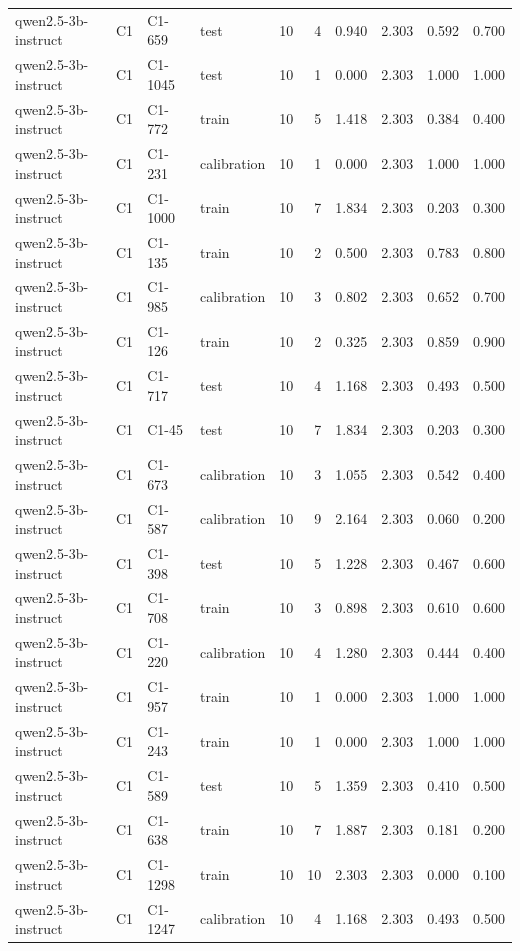 \begin{table}
\begin{tabular}{llllrrrrrr}
qwen2.5-3b-instruct & C1 & C1-659 & test & 10 & 4 & 0.940 & 2.303 & 0.592 & 0.700 \\
qwen2.5-3b-instruct & C1 & C1-1045 & test & 10 & 1 & 0.000 & 2.303 & 1.000 & 1.000 \\
qwen2.5-3b-instruct & C1 & C1-772 & train & 10 & 5 & 1.418 & 2.303 & 0.384 & 0.400 \\
qwen2.5-3b-instruct & C1 & C1-231 & calibration & 10 & 1 & 0.000 & 2.303 & 1.000 & 1.000 \\
qwen2.5-3b-instruct & C1 & C1-1000 & train & 10 & 7 & 1.834 & 2.303 & 0.203 & 0.300 \\
qwen2.5-3b-instruct & C1 & C1-135 & train & 10 & 2 & 0.500 & 2.303 & 0.783 & 0.800 \\
qwen2.5-3b-instruct & C1 & C1-985 & calibration & 10 & 3 & 0.802 & 2.303 & 0.652 & 0.700 \\
qwen2.5-3b-instruct & C1 & C1-126 & train & 10 & 2 & 0.325 & 2.303 & 0.859 & 0.900 \\
qwen2.5-3b-instruct & C1 & C1-717 & test & 10 & 4 & 1.168 & 2.303 & 0.493 & 0.500 \\
qwen2.5-3b-instruct & C1 & C1-45 & test & 10 & 7 & 1.834 & 2.303 & 0.203 & 0.300 \\
qwen2.5-3b-instruct & C1 & C1-673 & calibration & 10 & 3 & 1.055 & 2.303 & 0.542 & 0.400 \\
qwen2.5-3b-instruct & C1 & C1-587 & calibration & 10 & 9 & 2.164 & 2.303 & 0.060 & 0.200 \\
qwen2.5-3b-instruct & C1 & C1-398 & test & 10 & 5 & 1.228 & 2.303 & 0.467 & 0.600 \\
qwen2.5-3b-instruct & C1 & C1-708 & train & 10 & 3 & 0.898 & 2.303 & 0.610 & 0.600 \\
qwen2.5-3b-instruct & C1 & C1-220 & calibration & 10 & 4 & 1.280 & 2.303 & 0.444 & 0.400 \\
qwen2.5-3b-instruct & C1 & C1-957 & train & 10 & 1 & 0.000 & 2.303 & 1.000 & 1.000 \\
qwen2.5-3b-instruct & C1 & C1-243 & train & 10 & 1 & 0.000 & 2.303 & 1.000 & 1.000 \\
qwen2.5-3b-instruct & C1 & C1-589 & test & 10 & 5 & 1.359 & 2.303 & 0.410 & 0.500 \\
qwen2.5-3b-instruct & C1 & C1-638 & train & 10 & 7 & 1.887 & 2.303 & 0.181 & 0.200 \\
qwen2.5-3b-instruct & C1 & C1-1298 & train & 10 & 10 & 2.303 & 2.303 & 0.000 & 0.100 \\
qwen2.5-3b-instruct & C1 & C1-1247 & calibration & 10 & 4 & 1.168 & 2.303 & 0.493 & 0.500 \\

\end{tabular}
\end{table}

